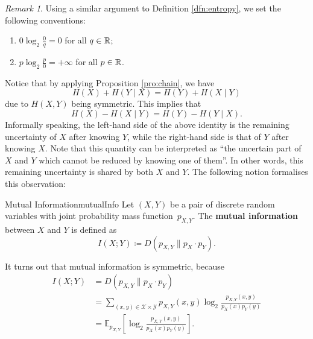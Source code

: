 \documentclass[math, code]{amznotes}
\theoremstyle{remark}
\newtheorem*{remark}{Remark}
\begin{document}
\begin{notebox}
    \begin{remark}
        Using a similar argument to Definition \ref{dfn:entropy}, we set the following conventions:
        \begin{enumerate}
            \item $0\log_2\frac{0}{q} = 0$ for all $q \in \mathbb{R}$;
            \item $p\log_2\frac{p}{0} = +\infty$ for all $p \in \mathbb{R}$.
        \end{enumerate}
    \end{remark}
\end{notebox}
Notice that by applying Proposition \ref{pro:chain}, we have 
\begin{equation*}
    H\left(X\right) + H\left(Y \mid X\right) = H\left(Y\right) + H\left(X \mid Y\right)
\end{equation*}
due to $H\left(X, Y\right)$ being symmetric. This implies that 
\begin{equation*}
    H\left(X\right) - H\left(X \mid Y\right) = H\left(Y\right) - H\left(Y \mid X\right).
\end{equation*}
Informally speaking, the left-hand side of the above identity is the remaining uncertainty of $X$ after knowing $Y$, while the right-hand side is that of $Y$ after knowing $X$. Note that this quantity can be interpreted as ``the uncertain part of $X$ and $Y$ which cannot be reduced by knowing one of them''. In other words, this remaining uncertainty is shared by both $X$ and $Y$. The following notion formalises this observation:
\begin{dfnbox}{Mutual Information}{mutualInfo}
    Let $\left(X, Y\right)$ be a pair of discrete random variables with joint probability mass function~$p_{X, Y}$. The {\color{red} \textbf{mutual information}} between $X$ and $Y$ is defined as 
    \begin{equation*}
        I\left(X ; Y\right) \coloneqq D\left(p_{X, Y} \parallel p_X \cdot p_Y\right).
    \end{equation*}
\end{dfnbox}
It turns out that mutual information is symmetric, because 
\begin{align*}
    I\left(X ; Y\right) & = D\left(p_{X, Y} \parallel p_X \cdot p_Y\right) \\
    & = \sum_{(x, y) \in \mathcal{X} \times \mathcal{Y}}p_{X, Y}(x, y)\log_2\frac{p_{X, Y}(x, y)}{p_X(x)p_Y(y)} \\
    & = \mathbb{E}_{p_{X, Y}}\left[\log_2\frac{p_{X, Y}(x, y)}{p_X(x)p_Y(y)}\right].
\end{align*}
\end{document}
